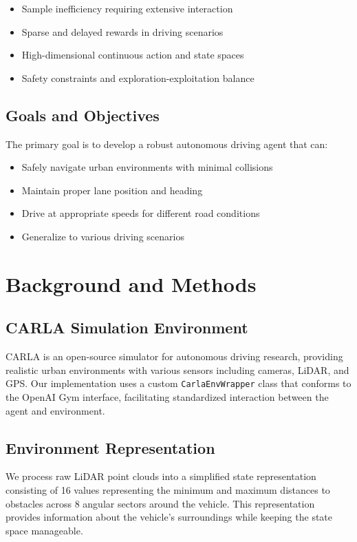 \documentclass[11pt,a4paper]{article}
\begin{document}
\begin{itemize}
    \item Sample inefficiency requiring extensive interaction
    \item Sparse and delayed rewards in driving scenarios
    \item High-dimensional continuous action and state spaces
    \item Safety constraints and exploration-exploitation balance
\end{itemize}

\subsection{Goals and Objectives}
The primary goal is to develop a robust autonomous driving agent that can:
\begin{itemize}
    \item Safely navigate urban environments with minimal collisions
    \item Maintain proper lane position and heading
    \item Drive at appropriate speeds for different road conditions
    \item Generalize to various driving scenarios
\end{itemize}

\section{Background and Methods}

\subsection{CARLA Simulation Environment}
CARLA is an open-source simulator for autonomous driving research, providing realistic urban environments with various sensors including cameras, LiDAR, and GPS. Our implementation uses a custom \texttt{CarlaEnvWrapper} class that conforms to the OpenAI Gym interface, facilitating standardized interaction between the agent and environment.

\subsection{Environment Representation}
We process raw LiDAR point clouds into a simplified state representation consisting of 16 values representing the minimum and maximum distances to obstacles across 8 angular sectors around the vehicle. This representation provides information about the vehicle's surroundings while keeping the state space manageable.
\end{document}
